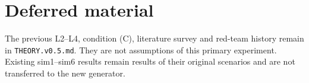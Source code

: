 \documentclass[11pt]{article}
\begin{document}
\section{Deferred material}
The previous L2--L4, condition (C), literature survey and red-team history\newline
remain in \texttt{THEORY.v0.5.md}. They are not assumptions of this primary
experiment. Existing sim1--sim6 results remain results of their original
scenarios and are not transferred to the new generator.
\end{document}
